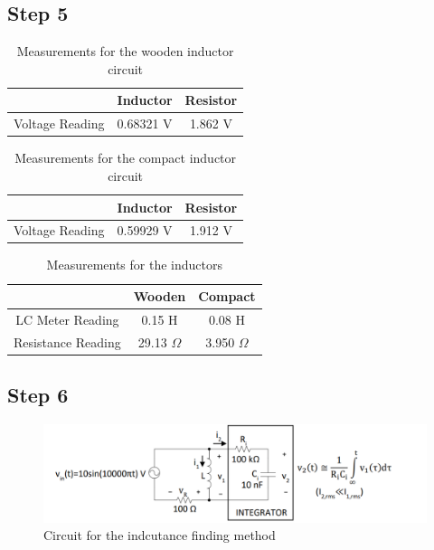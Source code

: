 \documentclass[letterpaper,12pt]{article}
\begin{document}
\subsection{Step 5}

\begin{table}[H]
	\begin{center}
		\caption{Measurements for the wooden inductor circuit}
		\vspace{2mm}
		\begin{tabular}{||c | c | c||} 
		 \hline
		   & Inductor & Resistor \\ [0.5ex] 
		 \hline\hline
		 Voltage Reading & 0.68321 V & 1.862 V \\
		 \hline
		\end{tabular}
\end{center}
\end{table}

\begin{table}[H]
	\begin{center}
		\caption{Measurements for the compact inductor circuit}
		\vspace{2mm}
		\begin{tabular}{||c | c | c||} 
		 \hline
		   & Inductor & Resistor \\ [0.5ex] 
		 \hline\hline
		 Voltage Reading & 0.59929 V & 1.912 V \\
		 \hline

		\end{tabular}
\end{center}
\end{table}


\begin{table}[H]
	\begin{center}
		\caption{Measurements for the inductors}
		\vspace{2mm}
		\begin{tabular}{||c | c | c||} 
		 \hline
		   & Wooden & Compact \\ [0.5ex] 
		 \hline\hline
		LC Meter Reading & 0.15 H & 0.08 H \\
		 \hline
		Resistance Reading & 29.13 \(\Omega\) & 3.950 \(\Omega\) \\
		 \hline
		\end{tabular}
\end{center}
\end{table}

\subsection{Step 6}
\begin{figure}[H]
	\centering
   \includegraphics[width=1\textwidth]{PRE7.png}
   \caption{Circuit for the indcutance finding method}
\end{figure}
\end{document}
